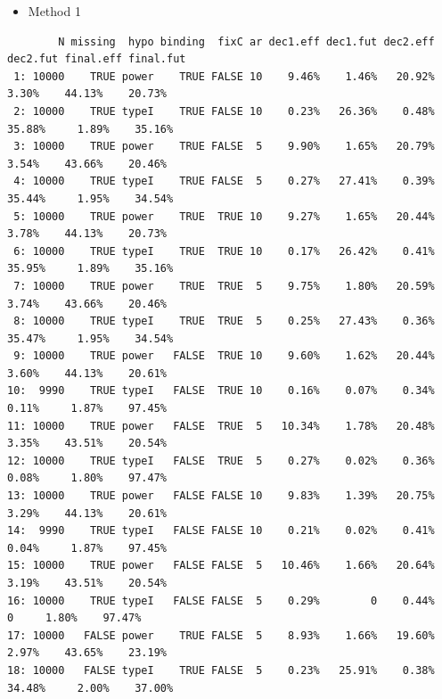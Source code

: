 \documentclass[12pt]{article}
\begin{document}
\begin{itemize}
\item Method 1
\end{itemize}
\begin{verbatim}
        N missing  hypo binding  fixC ar dec1.eff dec1.fut dec2.eff dec2.fut final.eff final.fut
 1: 10000    TRUE power    TRUE FALSE 10    9.46%    1.46%   20.92%    3.30%    44.13%    20.73%
 2: 10000    TRUE typeI    TRUE FALSE 10    0.23%   26.36%    0.48%   35.88%     1.89%    35.16%
 3: 10000    TRUE power    TRUE FALSE  5    9.90%    1.65%   20.79%    3.54%    43.66%    20.46%
 4: 10000    TRUE typeI    TRUE FALSE  5    0.27%   27.41%    0.39%   35.44%     1.95%    34.54%
 5: 10000    TRUE power    TRUE  TRUE 10    9.27%    1.65%   20.44%    3.78%    44.13%    20.73%
 6: 10000    TRUE typeI    TRUE  TRUE 10    0.17%   26.42%    0.41%   35.95%     1.89%    35.16%
 7: 10000    TRUE power    TRUE  TRUE  5    9.75%    1.80%   20.59%    3.74%    43.66%    20.46%
 8: 10000    TRUE typeI    TRUE  TRUE  5    0.25%   27.43%    0.36%   35.47%     1.95%    34.54%
 9: 10000    TRUE power   FALSE  TRUE 10    9.60%    1.62%   20.44%    3.60%    44.13%    20.61%
10:  9990    TRUE typeI   FALSE  TRUE 10    0.16%    0.07%    0.34%    0.11%     1.87%    97.45%
11: 10000    TRUE power   FALSE  TRUE  5   10.34%    1.78%   20.48%    3.35%    43.51%    20.54%
12: 10000    TRUE typeI   FALSE  TRUE  5    0.27%    0.02%    0.36%    0.08%     1.80%    97.47%
13: 10000    TRUE power   FALSE FALSE 10    9.83%    1.39%   20.75%    3.29%    44.13%    20.61%
14:  9990    TRUE typeI   FALSE FALSE 10    0.21%    0.02%    0.41%    0.04%     1.87%    97.45%
15: 10000    TRUE power   FALSE FALSE  5   10.46%    1.66%   20.64%    3.19%    43.51%    20.54%
16: 10000    TRUE typeI   FALSE FALSE  5    0.29%        0    0.44%        0     1.80%    97.47%
17: 10000   FALSE power    TRUE FALSE  5    8.93%    1.66%   19.60%    2.97%    43.65%    23.19%
18: 10000   FALSE typeI    TRUE FALSE  5    0.23%   25.91%    0.38%   34.48%     2.00%    37.00%
\end{verbatim}
\end{document}
